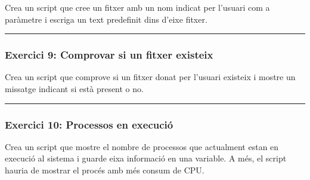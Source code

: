 \documentclass[
  12 pt,
  a4paper,
]{article}
\begin{document}
Crea un script que cree un fitxer amb un nom indicat per l'usuari com a
paràmetre i escriga un text predefinit dins d'eixe fitxer.

\begin{center}\rule{0.5\linewidth}{0.5pt}\end{center}

\subsubsection{\texorpdfstring{\textbf{Exercici 9: Comprovar si un
fitxer
existeix}}{Exercici 9: Comprovar si un fitxer existeix}}\label{exercici-9-comprovar-si-un-fitxer-existeix}

Crea un script que comprove si un fitxer donat per l'usuari existeix i
mostre un missatge indicant si està present o no.

\begin{center}\rule{0.5\linewidth}{0.5pt}\end{center}

\subsubsection{\texorpdfstring{\textbf{Exercici 10: Processos en
execució}}{Exercici 10: Processos en execució}}\label{exercici-10-processos-en-execuciuxf3}

Crea un script que mostre el nombre de processos que actualment estan en
execució al sistema i guarde eixa informació en una variable. A més, el
script hauria de mostrar el procés amb més consum de CPU.
\end{document}
